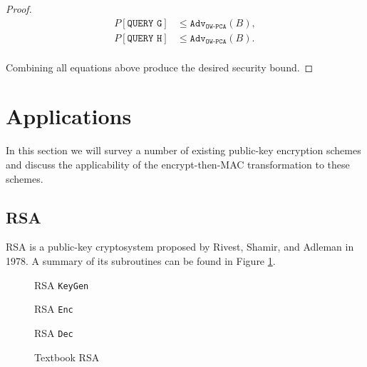 \documentclass[runningheads]{llncs}
\newcommand{\adv}{\texttt{Adv}}
\begin{document}
\begin{proof}
    \begin{equation*}
        \begin{aligned}
            P\left[\texttt{QUERY G}\right] &\leq \adv_\texttt{OW-PCA}(B), \\
            P\left[\texttt{QUERY H}\right] &\leq \adv_\texttt{OW-PCA}(B). \\
        \end{aligned}
    \end{equation*}

    Combining all equations above produce the desired security bound.
\end{proof}

\section{Applications}\label{sec:applications}
In this section we will survey a number of existing public-key encryption schemes and discuss the applicability of the encrypt-then-MAC transformation to these schemes.

\subsection{RSA}
RSA \cite{DBLP:journals/cacm/RivestSA78} is a public-key cryptosystem proposed by Rivest, Shamir, and Adleman in 1978. A summary of its subroutines can be found in Figure \ref{fig:textbook-rsa}. 

\begin{figure}[H]
    \centering

    \begin{minipage}[t]{0.33\textwidth}
        \begin{algorithm}[H]
            \caption*{RSA \texttt{KeyGen}}
        \end{algorithm}
    \end{minipage}
    \begin{minipage}[t]{0.32\textwidth}
        \begin{algorithm}[H]
            \caption*{RSA \texttt{Enc}}
        \end{algorithm}
    \end{minipage}
    \begin{minipage}[t]{0.32\textwidth}
        \begin{algorithm}[H]
            \caption*{RSA \texttt{Dec}}
        \end{algorithm}
    \end{minipage}
    \caption{Textbook RSA}\label{fig:textbook-rsa}
\end{figure}
\end{document}
